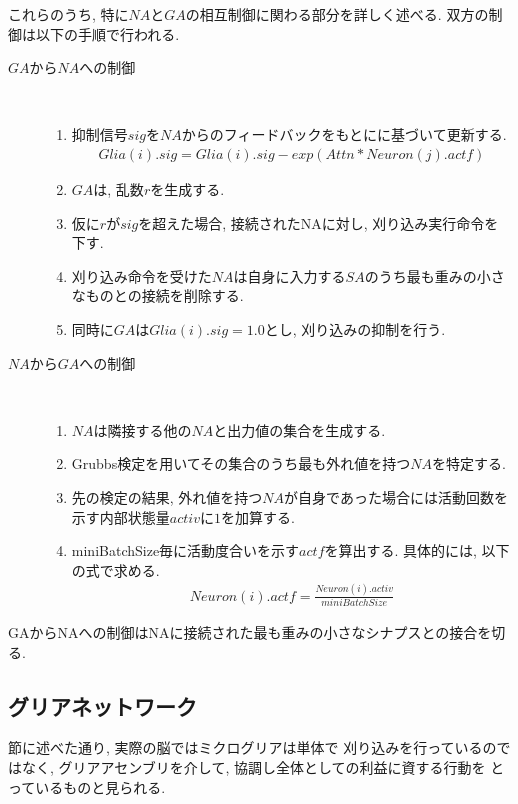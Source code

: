 \documentclass[a4paper,10.5pt,twocolumn]{jsarticle}
\begin{document}
これらのうち, 特に$NA$と$GA$の相互制御に関わる部分を詳しく述べる.
双方の制御は以下の手順で行われる.
\begin{description}
  \item[$GA$から$NA$への制御]\mbox{}\\
  \begin{enumerate}
    \item 抑制信号$sig$を$NA$からのフィードバックをもとにに基づいて更新する.
    \begin{align}
      Glia(i).sig=Glia(i).sig-exp(Attn*Neuron(j).actf)
      \label{eq:koushin}
    \end{align}
    \item $GA$は, 乱数$r$を生成する.
    \item 仮に$r$が$sig$を超えた場合, 接続されたNAに対し, 
    刈り込み実行命令を下す.
    \item 刈り込み命令を受けた$NA$は自身に入力する$SA$のうち最も重みの小さなものとの接続を削除する.
    \item 同時に$GA$は$Glia(i).sig=1.0$とし, 刈り込みの抑制を行う.
  \end{enumerate}
  \item[$NA$から$GA$への制御]\mbox{}\\
  \begin{enumerate}
    \item $NA$は隣接する他の$NA$と出力値の集合を生成する.
    \item Grubbs検定を用いてその集合のうち最も外れ値を持つ$NA$を特定する.
    \item 先の検定の結果, 外れ値を持つ$NA$が自身であった場合には活動回数を示す内部状態量$activ$に$1$を加算する.
    \item miniBatchSize毎に活動度合いを示す$actf$を算出する.
    具体的には, 以下の式で求める.
    \begin{align}
      Neuron(i).actf=\frac{Neuron(i).activ}{miniBatchSize}  
    \end{align}
  \end{enumerate}  
\end{description}
GAからNAへの制御はNAに接続された最も重みの小さなシナプスとの接合を切る.
\subsection{グリアネットワーク}
節に述べた通り, 実際の脳ではミクログリアは単体で
刈り込みを行っているのではなく, 
グリアアセンブリを介して, 協調し全体としての利益に資する行動を
とっているものと見られる.
\end{document}
